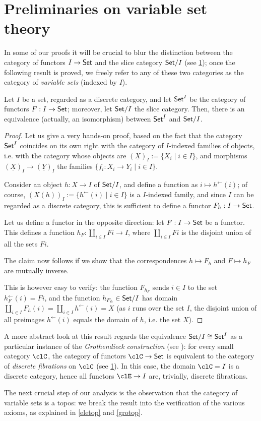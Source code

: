 \section{Preliminaries on variable set theory}
In some of our proofs it will be crucial to blur the distinction between the category of functors $I \to \mathsf{Set}$ and the slice category $\mathsf{Set}/I$ (see \ref{}); once the following result is proved, we freely refer to any of these two categories as the category of \emph{variable sets} (indexed by $I$).
\begin{proposition}
	Let $I$ be a set, regarded as a discrete category, and let $\mathsf{Set}^I$ be the category of functors $F : I \to \mathsf{Set}$; moreover, let $\mathsf{Set}/I$ the slice category. Then, there is an equivalence (actually, an isomorphism) between $\mathsf{Set}^I$ and $\mathsf{Set}/I$.
\end{proposition}
\begin{proof}
	Let us give a very hands-on proof, based on the fact that the category $\mathsf{Set}^I$ coincides on its own right with the category of $I$-indexed families of objects, i.e. with the category whose objects are $(\underline X)_I := \{X_i\mid i\in I\}$, and morphisms $(\underline X)_I\to (\underline Y)_I$ the families $\{f_i : X_i \to Y_i\mid i \in I\}$.

	Consider an object $h : X\to I$ of $\mathsf{Set}/I$, and define a function as $i\mapsto h^\leftarrow(i)$; of course, $(X(h))_I := \{h^\leftarrow(i) \mid i \in I\}$ is a $I$-indexed family, and since $I$ can be regarded as a discrete category, this is sufficient to define a functor $F_h : I \to \mathsf{Set}$.

	Let us define a functor in the opposite direction: let $F : I \to \mathsf{Set}$ be a functor. This defines a function $h_F : \coprod_{i\in I}Fi \to I$, where $\coprod_{i\in I} Fi$ is the disjoint union of all the sets $Fi$.

	The claim now follows if we show that the correspondences $h\mapsto F_h$ and $F\mapsto h_F$ are mutually inverse.

	This is however easy to verify: the function $F_{h_F}$ sends $i\in I$ to the set $h_F^\leftarrow(i)=Fi$, and the function $h_{F_h} \in \mathsf{Set}/I$ has domain $\coprod_{i\in I}F_h(i) = \coprod_{i\in I}h^\leftarrow(i)=X$ (as $i$ runs over the set $I$, the disjoint union of all preimages $h^\leftarrow(i)$ equals the domain of $h$, i.e. the set $X$).
\end{proof}
\begin{remark}
	A more abstract look at this result regards the equivalence $\mathsf{Set}/I\cong \mathsf{Set}^I$ as a particular instance of the \emph{Grothendieck construction} (see \cite{}): for every small category $\clC$, the category of functors $\clC\to\Set$ is equivalent to the category of \emph{discrete fibrations} on $\clC$ (see \ref{}). In this case, the domain $\clC=I$ is a discrete category, hence all functors $\clE \to I$ are, trivially, discrete fibrations.
\end{remark}
The next crucial step of our analysis is the observation that the category of variable sets is a topos: we break the result into the verification of the various axioms, as explained in \ref{eletop} and \ref{grotop}.

